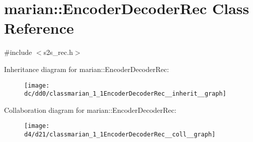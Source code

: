 \hypertarget{classmarian_1_1EncoderDecoderRec}{}\section{marian\+:\+:Encoder\+Decoder\+Rec Class Reference}
\label{classmarian_1_1EncoderDecoderRec}


{\ttfamily \#include $<$s2s\+\_\+rec.\+h$>$}



Inheritance diagram for marian\+:\+:Encoder\+Decoder\+Rec\+:
\nopagebreak
\begin{figure}[H]
\begin{center}
\leavevmode
\texttt{[image: dc/dd0/classmarian\_1\_1EncoderDecoderRec\_\_inherit\_\_graph]}
\end{center}
\end{figure}


Collaboration diagram for marian\+:\+:Encoder\+Decoder\+Rec\+:
\nopagebreak
\begin{figure}[H]
\begin{center}
\leavevmode
\texttt{[image: d4/d21/classmarian\_1\_1EncoderDecoderRec\_\_coll\_\_graph]}
\end{center}
\end{figure}
